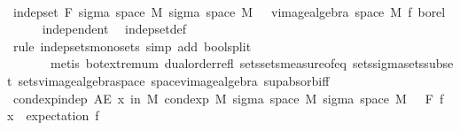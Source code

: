 \begin{isabellebody}
%
\isadelimproof
%
\endisadelimproof
%
\isatagproof
{}\isamarkupfalse%
\ {\isacharminus}{\kern0pt}\isanewline
\ \ \isamarkupfalse%
\ {\isachardoublequoteopen}indep{\isacharunderscore}{\kern0pt}set\ F\ {\isacharparenleft}{\kern0pt}sigma\ {\isacharparenleft}{\kern0pt}space\ M{\isacharparenright}{\kern0pt}\ {\isacharparenleft}{\kern0pt}sigma\ {\isacharparenleft}{\kern0pt}space\ M{\isacharparenright}{\kern0pt}\ {\isacharbraceleft}{\kern0pt}{\isacharbraceright}{\kern0pt}\ {\isasymunion}\ {\isacharparenleft}{\kern0pt}vimage{\isacharunderscore}{\kern0pt}algebra\ {\isacharparenleft}{\kern0pt}space\ M{\isacharparenright}{\kern0pt}\ f\ borel{\isacharparenright}{\kern0pt}{\isacharparenright}{\kern0pt}{\isacharparenright}{\kern0pt}{\isachardoublequoteclose}\isanewline
\ \ \ \ \isamarkupfalse%
\ independent\ \isamarkupfalse%
\ indep{\isacharunderscore}{\kern0pt}set{\isacharunderscore}{\kern0pt}def\ \isanewline
\ \ \ \ \isamarkupfalse%
\ {\isacharparenleft}{\kern0pt}rule\ indep{\isacharunderscore}{\kern0pt}sets{\isacharunderscore}{\kern0pt}mono{\isacharunderscore}{\kern0pt}sets{\isacharcomma}{\kern0pt}\ simp\ add{\isacharcolon}{\kern0pt}\ bool{\isachardot}{\kern0pt}split{\isacharparenright}{\kern0pt}\ \isanewline
\ \ \ \ \ \ \ {\isacharparenleft}{\kern0pt}metis\ bot{\isachardot}{\kern0pt}extremum\ dual{\isacharunderscore}{\kern0pt}order{\isachardot}{\kern0pt}refl\ sets{\isachardot}{\kern0pt}sets{\isacharunderscore}{\kern0pt}measure{\isacharunderscore}{\kern0pt}of{\isacharunderscore}{\kern0pt}eq\ sets{\isachardot}{\kern0pt}sigma{\isacharunderscore}{\kern0pt}sets{\isacharunderscore}{\kern0pt}subset{\isacharprime}{\kern0pt}\ sets{\isacharunderscore}{\kern0pt}vimage{\isacharunderscore}{\kern0pt}algebra{\isacharunderscore}{\kern0pt}space\ space{\isacharunderscore}{\kern0pt}vimage{\isacharunderscore}{\kern0pt}algebra\ sup{\isachardot}{\kern0pt}absorb{\isacharunderscore}{\kern0pt}iff{}{\isacharparenright}{\kern0pt}\isanewline
\ \ \isamarkupfalse%
\ cond{\isacharunderscore}{\kern0pt}exp{\isacharunderscore}{\kern0pt}indep{\isacharcolon}{\kern0pt}\ {\isachardoublequoteopen}AE\ x\ in\ M{\isachardot}{\kern0pt}\ cond{\isacharunderscore}{\kern0pt}exp\ M\ {\isacharparenleft}{\kern0pt}sigma\ {\isacharparenleft}{\kern0pt}space\ M{\isacharparenright}{\kern0pt}\ {\isacharparenleft}{\kern0pt}sigma\ {\isacharparenleft}{\kern0pt}space\ M{\isacharparenright}{\kern0pt}\ {\isacharbraceleft}{\kern0pt}{\isacharbraceright}{\kern0pt}\ {\isasymunion}\ F{\isacharparenright}{\kern0pt}{\isacharparenright}{\kern0pt}\ f\ x\ {\isacharequal}{\kern0pt}\ expectation\ f{\isachardoublequoteclose}\isanewline

\end{isabellebody}
